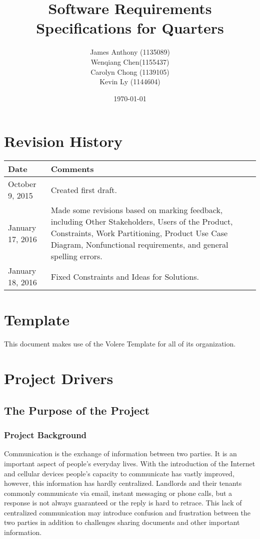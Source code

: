 \documentclass[12pt]{article}
\begin{document}
\title{Software Requirements Specifications for Quarters} 
\author{James Anthony (1135089)\\ Wenqiang Chen(1155437)\\ Carolyn Chong 
(1139105)\\ Kevin Ly (1144604)}
\date{\today}
\maketitle

\pagebreak

\tableofcontents 
\listoffigures
\listoftables

\section*{Revision History}
\begin{longtable}{|p{5cm}|p{10cm}|}
\hline
\textbf{Date}  & \textbf{Comments} \\ \hline
October 9, 2015 & Created first draft. \\ 
\hline
January 17, 2016 & Made some revisions based on marking feedback, including Other Stakeholders, Users of the Product, Constraints, Work Partitioning, Product Use Case Diagram, Nonfunctional requirements, and general spelling errors. \\ 
\hline
January 18, 2016 & Fixed Constraints and Ideas for Solutions. \\ 
\hline
\end{longtable}

\section*{Template}
This document makes use of the Volere Template for all of its organization.

\pagebreak

\section{Project Drivers}
\subsection{The Purpose of the Project}
\subsubsection{Project Background}
Communication is the exchange of information between two parties. It is an important aspect of people's everyday lives. With the introduction 
of the Internet and cellular devices people's capacity to communicate has vastly 
improved, however, this information has hardly centralized. Landlords and their 
tenants commonly communicate via email, instant messaging or phone calls, but a response is not always guaranteed or the reply is hard to retrace. This lack of centralized 
communication may introduce confusion and frustration between the two parties in addition to challenges sharing documents and other important information.\\
\end{document}
